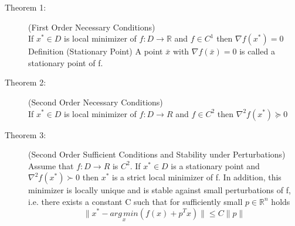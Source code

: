 \begin{tcolorbox}[colback=blue!5!white,colframe=blue!75!black,title=\textbf{Unconstrainded Optimization}]
\begin{description}
	\item[\small Theorem 1:](First Order Necessary Conditions)\\
		If $x^* \in D$ is local minimizer of $f : D \rightarrow \mathbb{R}$ and $f \in C^1$ then
		$\nabla f (x^*) = 0$
		Definition (Stationary Point) A point $\bar{x}$ with $\nabla f(\bar{x}) = 0$ is called a stationary point of f.
	
	\item[\small Theorem 2:] (Second Order Necessary Conditions)\\
		If $x^* \in D$ is local minimizer of $f : D \rightarrow R$ and $f \in C^2$ then
		$\nabla^2 f(x^*) \succeq 0$
	
	\item[\small Theorem 3:] (Second Order Sufficient Conditions and Stability under Perturbations)\\
		Assume that $f : D \rightarrow R$ is $C^2.$ If $x^* \in D$ is a stationary point and
		$ \nabla^2 f(x^*) \succ 0$
		then $x^*$ is a strict local minimizer of f. In addition, this minimizer is locally unique and is stable against small perturbations of f, i.e. there exists a constant C such that for sufficiently small $p \in \mathbb{R}^n$ holds\\
		\begin{equation*}
		\lVert{x^* - \underset{x}{arg\,min}  (f(x) + p^T x)}\rVert \leq C \lVert p \rVert
		\end{equation*}	
\end{description}
\end{tcolorbox}